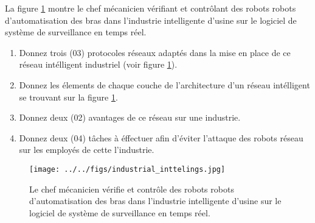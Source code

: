 
La figure \ref{fig:iiot} montre le chef mécanicien vérifiant et contrôlant des robots robots d'automatisation des bras dans l'industrie intelligente d'usine sur le logiciel de système de surveillance en temps réel.

\begin{enumerate}
    \item Donnez trois (03) protocoles réseaux adaptés dans la mise en place de ce réseau intélligent industriel (voir figure \ref{fig:iiot}).
    \item Donnez les élements de chaque couche de l'architecture d'un réseau intélligent se trouvant sur la figure \ref{fig:iiot}.
    \item Donnez deux (02) avantages de ce réseau sur une industrie.
    \item Donnez deux (04) tâches à éffectuer afin d'éviter l'attaque des robots réseau sur les employés de cette l'industrie.
\end{enumerate}

\begin{figure}[!ht]
    \centering
    \texttt{[image: ../../figs/industrial\_inttelings.jpg]}
    \caption{Le chef mécanicien vérifie et contrôle des robots robots d'automatisation des bras dans l'industrie intelligente d'usine sur le logiciel de système de surveillance en temps réel.}
    \label{fig:iiot}
\end{figure}